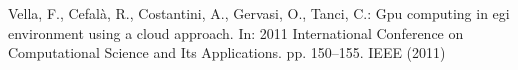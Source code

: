 \begin{thebibliography}{10}

Vella, F., Cefal\`a, R., Costantini, A., Gervasi, O., Tanci, C.: Gpu computing
  in egi environment using a cloud approach. In: 2011 International Conference
  on Computational Science and Its Applications. pp. 150--155. IEEE (2011)
\end{thebibliography}
